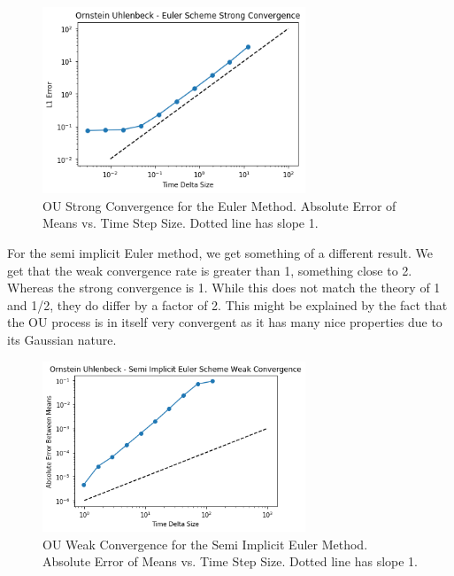 \documentclass[onecolumn,notitlepage,pra,10pt,aps]{revtex4-1}
\begin{document}
  \begin{figure}[H]
    \centering
      \includegraphics[width=0.7\textwidth]{ou_strong_euler.png}
    \caption{OU Strong Convergence for the Euler Method. Absolute Error of Means vs. Time Step Size. Dotted line has slope 1.}
  \end{figure}

  For the semi implicit Euler method, we get something of a different result. We get that the weak convergence rate is greater than 1, something close to 2. Whereas the strong convergence is 1. While this does not match the theory of 1 and 1/2, they do differ by a factor of 2. This might be explained by the fact that the OU process is in itself very convergent as it has many nice properties due to its Gaussian nature.

  \begin{figure}[H]
    \centering
      \includegraphics[width=0.7\textwidth]{ou_weak_semi.png}
    \caption{OU Weak Convergence for the Semi Implicit Euler Method. Absolute Error of Means vs. Time Step Size. Dotted line has slope 1.}
  \end{figure}
\end{document}
